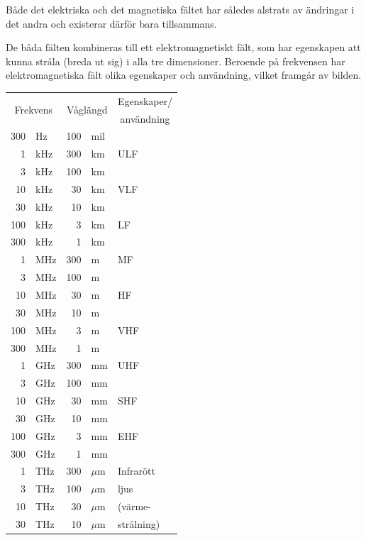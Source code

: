 Både det elektriska och det magnetiska fältet har således alstrats av ändringar
i det andra och existerar därför bara tillsammans.

De båda fälten kombineras till ett elektromagnetiskt fält, som har egenskapen
att kunna stråla (breda ut sig) i alla tre dimensioner. Beroende på frekvensen
har elektromagnetiska fält olika egenskaper och användning, vilket framgår av
bilden.

\begin{table}
\begin{center}
\begin{tabular}{|rl|rl|l|}
\hline
\multicolumn{2}{|c|}{\multirow{2}{*}{Frekvens}} & \multicolumn{2}{|c|}{\multirow{2}{*}{Våglängd}} & \multicolumn{1}{|c|}{Egenskaper/} \\
 & & & & \multicolumn{1}{|c|}{användning} \\ \hline
300 & Hz  & 100 & mil & \\
  1 & kHz & 300 & km & ULF \\ \cline{5-5}
  3 & kHz & 100 & km & \\
 10 & kHz &  30 & km & VLF \\ \cline{5-5}
 30 & kHz &  10 & km & \\
100 & kHz &   3 & km & LF \\ \cline{5-5}
300 & kHz &   1 & km & \\
  1 & MHz & 300 & m & MF \\ \cline{5-5}
  3 & MHz & 100 & m & \\
 10 & MHz &  30 & m & HF \\ \cline{5-5}
 30 & MHz &  10 & m & \\
100 & MHz &   3 & m & VHF \\ \cline{5-5}
300 & MHz &   1 & m & \\
  1 & GHz & 300 & mm & UHF \\ \cline{5-5}
  3 & GHz & 100 & mm & \\
 10 & GHz &  30 & mm & SHF \\ \cline{5-5}
 30 & GHz &  10 & mm & \\
100 & GHz &   3 & mm & EHF\\ \cline{5-5}
300 & GHz &   1 & mm & \\\
  1 & THz & 300 & \(\mu\)m & Infrarött \\
  3 & THz & 100 & \(\mu\)m & ljus \\
 10 & THz &  30 & \(\mu\)m & (värme- \\
 30 & THz &  10 & \(\mu\)m & strålning) \\

\end{tabular}
\end{center}
\end{table}
